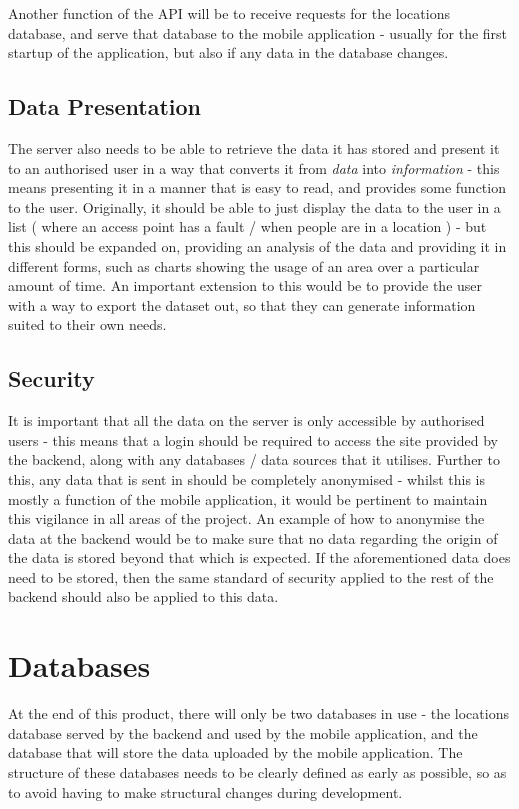 \documentclass[11pt]{informatics-report}
\begin{document}
Another function of the API will be to receive requests for the locations database, and serve that database to the mobile application - usually for the first startup of the application, but also if any data in the database changes.  

\subsection{Data Presentation}

The server also needs to be able to retrieve the data it has stored and present it to an authorised user in a way that converts it from \textit{data} into \textit{information} - this means presenting it in a manner that is easy to read, and provides some function to the user. Originally, it should be able to just display the data to the user in a list ( where an access point has a fault / when people are in a location ) - but this should be expanded on, providing an analysis of the data and providing it in different forms, such as charts showing the usage of an area over a particular amount of time. An important extension to this would be to provide the user with a way to export the dataset out, so that they can generate information suited to their own needs.

\subsection{Security}

It is important that all the data on the server is only accessible by authorised users - this means that a login should be required to access the site provided by the backend, along with any databases / data sources that it utilises. Further to this, any data that is sent in should be completely anonymised - whilst this is mostly a function of the mobile application, it would be pertinent to maintain this vigilance in all areas of the project. An example of how to anonymise the data at the backend would be to make sure that no data regarding the origin of the data is stored beyond that which is expected. If the aforementioned data does need to be stored, then the same standard of security applied to the rest of the backend should also be applied to this data.


\section{Databases}

At the end of this product, there will only be two databases in use - the locations database served by the backend and used by the mobile application, and the database that will store the data uploaded by the mobile application. The structure of these databases needs to be clearly defined as early as possible, so as to avoid having to make structural changes during development. 
\end{document}
